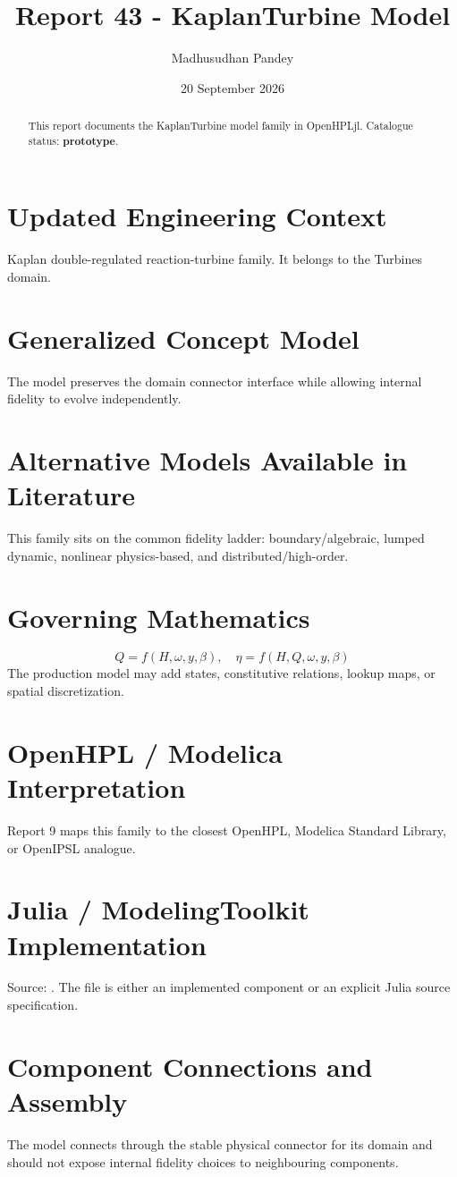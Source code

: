 \documentclass[10pt,a4paper]{article}
\title{Report 43 - KaplanTurbine Model}
\author{Madhusudhan Pandey}
\date{20 September 2026}
\begin{document}
\maketitle
\begin{abstract}This report documents the KaplanTurbine model family in OpenHPLjl. Catalogue status: \textbf{prototype}.\end{abstract}
\section{Updated Engineering Context}Kaplan double-regulated reaction-turbine family. It belongs to the Turbines domain.
\section{Generalized Concept Model}The model preserves the domain connector interface while allowing internal fidelity to evolve independently.
\section{Alternative Models Available in Literature}This family sits on the common fidelity ladder: boundary/algebraic, lumped dynamic, nonlinear physics-based, and distributed/high-order.
\section{Governing Mathematics}\[Q=f(H,\omega,y,\beta),\quad \eta=f(H,Q,\omega,y,\beta)\]The production model may add states, constitutive relations, lookup maps, or spatial discretization.
\section{OpenHPL / Modelica Interpretation}Report 9 maps this family to the closest OpenHPL, Modelica Standard Library, or OpenIPSL analogue.
\section{Julia / ModelingToolkit Implementation}Source: \texttt{}. The file is either an implemented component or an explicit Julia source specification.
\section{Component Connections and Assembly}The model connects through the stable physical connector for its domain and should not expose internal fidelity choices to neighbouring components.
\end{document}
